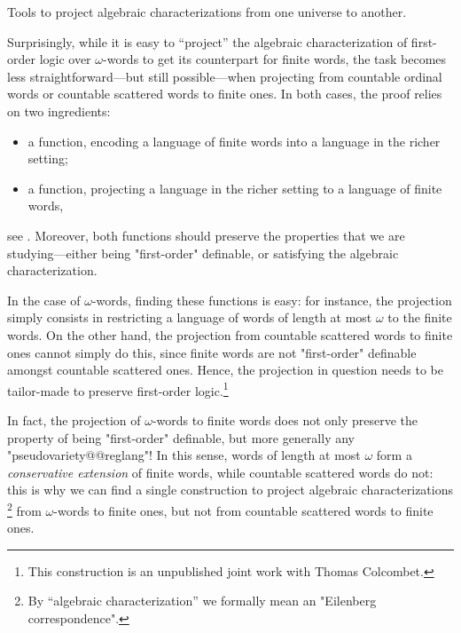 \begin{marginfigure}
	\centering
	\begin{tikzpicture}
		
	\end{tikzpicture}
	\caption{
		\AP\label{fig:adjunction-informal}
		Tools to project algebraic characterizations from one universe to another.
	}
\end{marginfigure}
Surprisingly, while it is easy to ``project'' the algebraic characterization
of first-order logic over $\omega$-words to get its counterpart for finite words,
the task becomes less straightforward---but still possible---when projecting from
countable ordinal words or countable scattered words to finite ones.
In both cases, the proof relies on two ingredients:
\begin{itemize}
	\item a function, encoding a language of finite words into
		a language in the richer setting;
	\item a function, projecting a language in the richer setting
		to a language of finite words,
\end{itemize}
see .
Moreover, both functions should preserve the properties that we are studying---either
being "first-order" definable, or satisfying the algebraic characterization.

In the case of $\omega$-words, finding these functions is easy: for instance, 
the projection simply consists in restricting a language of words of
length at most $\omega$ to the finite words.
On the other hand, the projection from countable scattered words
to finite ones cannot simply do this, since finite words are not
"first-order" definable amongst countable scattered ones.
Hence, the projection in question needs to be tailor-made to 
preserve first-order logic.\footnote{This construction is an unpublished joint
work with Thomas Colcombet.}

In fact, the projection of $\omega$-words to finite words does not only preserve
the property of being "first-order" definable, but more generally any
"pseudovariety@@reglang"! In this sense, words of length at most $\omega$
form a \emph{conservative extension} of finite words, while
countable scattered words do not: this is why we can find a single construction
to project algebraic characterizations%
\footnote{By ``algebraic characterization'' we formally mean an "Eilenberg correspondence".}
from $\omega$-words to finite ones, but not from countable scattered words to finite ones.


